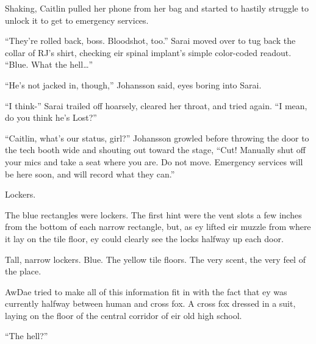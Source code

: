 Shaking, Caitlin pulled her phone from her bag and started to hastily struggle to unlock it to get to emergency services.

``They're rolled back, boss. Bloodshot, too.'' Sarai moved over to tug back the collar of RJ's shirt, checking eir spinal implant's simple color-coded readout. ``Blue. What the hell\ldots{}''

``He's not jacked in, though,'' Johansson said, eyes boring into Sarai.

``I think-'' Sarai trailed off hoarsely, cleared her throat, and tried again. ``I mean, do you think he's Lost?''

``Caitlin, what's our status, girl?'' Johansson growled before throwing the door to the tech booth wide and shouting out toward the stage, ``Cut! Manually shut off your mics and take a seat where you are. Do not move. Emergency services will be here soon, and will record what they can.''

\secdiv

Lockers.

The blue rectangles were lockers. The first hint were the vent slots a few inches from the bottom of each narrow rectangle, but, as ey lifted eir muzzle from where it lay on the tile floor, ey could clearly see the locks halfway up each door.

Tall, narrow lockers. Blue. The yellow tile floors. The very scent, the very feel of the place.

AwDae tried to make all of this information fit in with the fact that ey was currently halfway between human and cross fox. A cross fox dressed in a suit, laying on the floor of the central corridor of eir old high school.

``The hell?''
